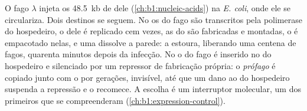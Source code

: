 \begin{proposition}\label{prop:b1:genomes:lambda}
O fago $\lambda$ injeta os \qty{48.5}{kb} de  dele
(\cref{ch:b1:nucleic-acids}) na \emph{E. coli}, onde ele se
circulariza. Dois destinos se seguem. No \emph{} os  do
fago são transcritos pela polimerase do hospedeiro, o  dele é
replicado cem vezes, as  do  são fabricadas e montadas,
o  é empacotado nelas, e uma  dissolve a parede: a 
estoura, liberando uma centena de fagos, quarenta minutos depois da
infecção. No \emph{} o  do fago é inserido no
 do hospedeiro e silenciado por um repressor de fabricação
própria: o \emph{prófago} é copiado junto com o  por gerações,
invisível, até que um dano ao  do hospedeiro suspenda a repressão e o
 recomece. A escolha é um interruptor molecular, um dos
primeiros que se compreenderam (\cref{ch:b1:expression-control}).
\end{proposition}

